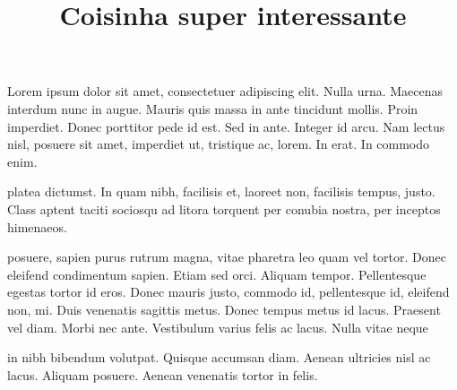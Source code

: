 \documentclass[a4paper]{article}
\title{Coisinha super interessante}
\begin{document}
\maketitle

\listoftodos

Lorem ipsum dolor sit amet, consectetuer adipiscing elit. Nulla
%
urna. Maecenas interdum nunc in augue. Mauris quis massa in ante
tincidunt mollis. Proin imperdiet. Donec porttitor pede id est. Sed
in ante. Integer id arcu. Nam lectus nisl, posuere sit amet,
imperdiet ut, tristique ac, lorem. In erat. In commodo enim.

%
platea dictumst. In quam nibh, facilisis et, laoreet non, facilisis
tempus, justo. Class aptent taciti sociosqu ad litora torquent per
conubia nostra, per inceptos himenaeos.


posuere, sapien purus rutrum magna, vitae pharetra leo quam vel
tortor. Donec eleifend condimentum sapien. Etiam sed orci. Aliquam
tempor. Pellentesque egestas tortor id eros. Donec mauris justo,
commodo id, pellentesque id, eleifend non, mi. Duis venenatis
sagittis metus. Donec tempus metus id lacus. Praesent vel diam.
Morbi nec ante. Vestibulum varius felis ac lacus. Nulla vitae neque

%
in nibh bibendum volutpat. Quisque accumsan diam. Aenean ultricies
nisl ac lacus. Aliquam posuere. Aenean venenatis tortor in felis.
\end{document}
